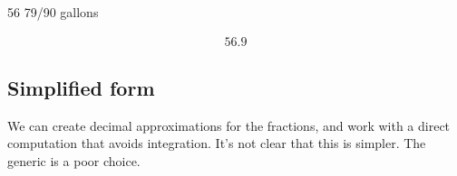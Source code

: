 \documentclass[letterpaper,10pt,english]{sphinxmanual}
\begin{document}
\begin{sphinxVerbatim}[commandchars=\\\{\}]
     \PYG{p}{[}\PYG{p}{]}
  
\end{sphinxVerbatim}

\begin{sphinxVerbatim}[commandchars=\\\{\}]
\PYGZsq{}56 79/90 gallons\PYGZsq{}
\end{sphinxVerbatim}

\begin{sphinxVerbatim}[commandchars=\\\{\}]
\end{sphinxVerbatim}
\begin{equation*}
\begin{split}\displaystyle 56.9\end{split}
\end{equation*}

\subsection{Simplified form}
\label{\detokenize{prism-irregular:simplified-form}}
\sphinxAtStartPar
We can create decimal approximations for the fractions, and work with a direct computation that avoids integration. It’s not clear that this is simpler. The generic  is a poor choice.
\end{document}
